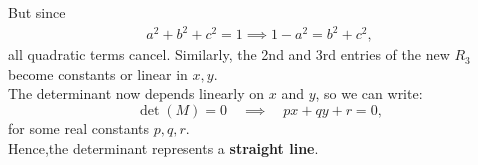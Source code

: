 \documentclass[journal]{IEEEtran}
\begin{document}
But since 
\begin{align}
a^2 + b^2 + c^2 = 1 \implies 1 - a^2 = b^2 + c^2,
\end{align}
all quadratic terms cancel.
Similarly, the 2nd and 3rd entries of the new $R_3$ become constants or linear in $x, y$.\\
The determinant now depends linearly on $x$ and $y$, so we can write:
\[
\det(M) = 0 \quad \implies \quad px + qy + r = 0,
\]
for some real constants $p, q, r$. \\
Hence,the determinant represents a \textbf{straight line}.
\end{document}

